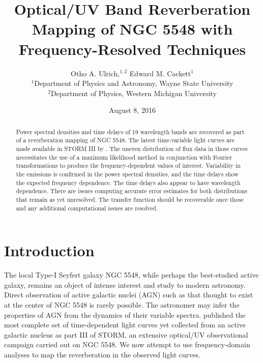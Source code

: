 \documentclass[11pt,letterpaper]{article}
\begin{document}
\title{Optical/UV Band
Reverberation Mapping of NGC 5548 with Frequency-Resolved Techniques}

\author{Otho A. Ulrich,$^{1,2}$ Edward M. Cackett$^{1}$
\\
$^{1}$Department of Physics and Astronomy, Wayne State University\\
$^{2}$Department of Physics, Western Michigan University\\
}
\date{August 8, 2016}

\maketitle

\begin{abstract}

Power spectral densities and time delays of 19 wavelength bands are recovered as part of a reverberation mapping of NGC 5548. The latest time-variable light curves are made available in STORM III by \cite{2016ApJ...821...56F}. The uneven distribution of flux data in those curves necessitates the use of a maximum likelihood method in conjunction with Fourier transformations to produce the frequency-dependent values of interest. Variability in the emissions is confirmed in the power spectral densities, and the time delays show the expected frequency dependence. The time delays also appear to have wavelength dependence. There are issues computing accurate error estimates for both distributions that remain as yet unresolved. The transfer function should be recoverable once those and any additional computational issues are resolved.

\end{abstract}

\section{Introduction}

The local Type-I Seyfert galaxy NGC 5548, while perhaps the best-studied active galaxy, remains an object of intense interest and study to modern astronomy. Direct observation of active galactic nuclei (AGN) such as that thought to exist at the center of NGC 5548 is rarely possible. The astronomer may infer the properties of AGN from the dynamics of their variable spectra. \cite{2016ApJ...821...56F} published the most complete set of time-dependent light curves yet collected from an active galactic nucleus as part III of STORM, an extensive optical/UV observational campaign carried out on NGC 5548. We now attempt to use frequency-domain analyses to map the reverberation in the observed light curves.
\end{document}
